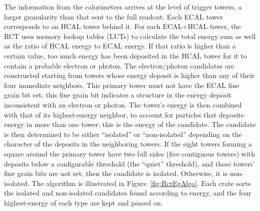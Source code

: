 The information from the calorimeters arrives at the level of trigger towers, 
a larger granularity than that sent to the full readout.  
Each ECAL tower corresponds to an HCAL tower behind it.  
For each ECAL+HCAL tower, the RCT uses memory lookup tables (LUTs) to 
calculate the total energy sum 
as well as the ratio of HCAL energy to ECAL energy.  
If that ratio is higher than a certain value, 
too much energy has been deposited in the HCAL tower for it to 
contain a probable electron or photon.  
The electron/photon candidates are constructed starting from 
towers whose energy deposit is higher than any of their 
four immediate neighbors.  
This primary tower must not have the ECAL fine grain bit set; 
this fine grain bit indicates a structure in the energy deposit 
inconsistent with an electron or photon.  
The tower's energy is then combined with that of its highest-energy 
neighbor, to account for particles that deposite energy 
in more than one tower; 
this is the energy of the candidate.  
The candidate is then determined to be either ``isolated'' or 
``non-isolated'' depending on the character of the deposits 
in the neighboring towers.  
If the eight towers forming a square around the primary tower 
have two full sides (five contiguous towers) with 
deposits below a configurable threshold (the ``quiet'' threshold), 
and these towers' fine grain bits are not set, 
then the candidate is isolated.  
Otherwise, it is non-isolated.  
The algorithm is illustrated in Figure~\ref{fig:RctEgAlgo}.  
Each crate sorts the isolated and non-isolated candidates found 
according to energy, 
and the four highest-energy of each type are kept and passed on.  

